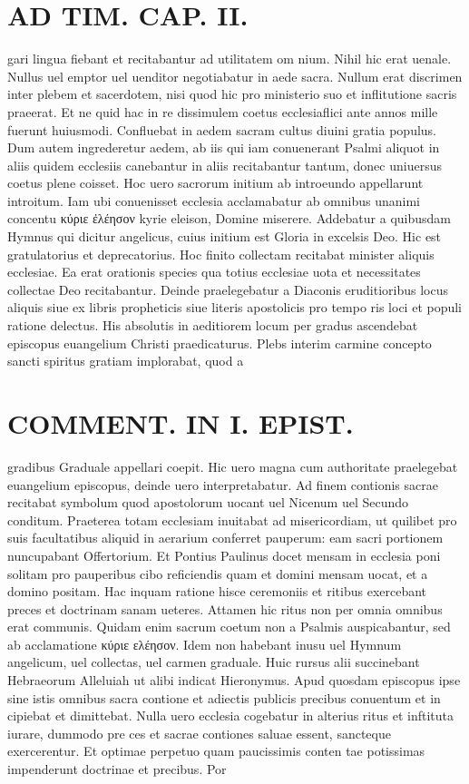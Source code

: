 \documentclass{article}
\begin{document}
\begin{pages}
\section*{AD TIM. CAP. II. }
\marginpar{[ p.109 ]}\pstart gari lingua fiebant et recitabantur ad utilitatem om nium. Nihil hic erat uenale. Nullus uel emptor uel uenditor negotiabatur in aede sacra. Nullum erat discrimen inter plebem et sacerdotem, nisi quod hic pro ministerio suo et inflitutione sacris praeerat. Et ne quid hac in re dissimulem coetus ecclesiaflici ante annos mille fuerunt huiusmodi. Confluebat in aedem sacram cultus diuini gratia populus. Dum autem ingrederetur aedem, ab iis qui iam conuenerant Psalmi aliquot in aliis quidem ecclesiis canebantur in aliis recitabantur tantum, donec uniuersus coetus plene coisset. Hoc uero sacrorum initium ab introeundo appellarunt introitum. Iam ubi conuenisset ecclesia acclamabatur ab omnibus unanimi concentu κύριε ἐλέησον kyrie eleison, Domine miserere. Addebatur a quibusdam Hymnus qui dicitur angelicus, cuius initium est Gloria in excelsis Deo. Hic est gratulatorius et deprecatorius. Hoc finito collectam recitabat minister aliquis ecclesiae. Ea erat orationis species qua totius ecclesiae uota et necessitates collectae Deo recitabantur. Deinde praelegebatur a Diaconis eruditioribus locus aliquis siue ex libris propheticis siue literis apostolicis pro tempo ris loci et populi ratione delectus. His absolutis in aeditiorem locum per gradus ascendebat episcopus euangelium Christi praedicaturus. Plebs interim carmine concepto sancti spiritus gratiam implorabat, quod a  \pend
\section*{COMMENT. IN I. EPIST. }\pstart gradibus Graduale appellari coepit. Hic uero magna cum authoritate praelegebat euangelium episcopus, deinde uero interpretabatur. Ad finem contionis sacrae recitabat symbolum quod apostolorum uocant uel Nicenum uel Secundo conditum. Praeterea totam ecclesiam inuitabat ad misericordiam, ut quilibet pro suis facultatibus aliquid in aerarium conferret pauperum: eam sacri portionem nuncupabant Offertorium. Et Pontius Paulinus docet mensam in ecclesia poni solitam pro pauperibus cibo reficiendis quam et domini mensam uocat, et a domino positam. Hac inquam ratione hisce ceremoniis et ritibus exercebant preces et doctrinam sanam ueteres. Attamen hic ritus non per omnia omnibus erat communis. Quidam enim sacrum coetum non a Psalmis auspicabantur, sed ab acclamatione κύριε ελέησον. Idem non habebant inusu uel Hymnum angelicum, uel collectas, uel carmen graduale. Huic rursus alii succinebant Hebraeorum Alleluiah ut alibi indicat Hieronymus. Apud quosdam episcopus ipse sine istis omnibus sacra contione et adiectis publicis precibus conuentum et in cipiebat et dimittebat. Nulla uero ecclesia cogebatur in alterius ritus et inftituta iurare, dummodo pre ces et sacrae contiones saluae essent, sancteque exercerentur. Et optimae perpetuo quam paucissimis conten tae potissimas impenderunt doctrinae et precibus. Por  \pend

\end{pages}
\end{document}

